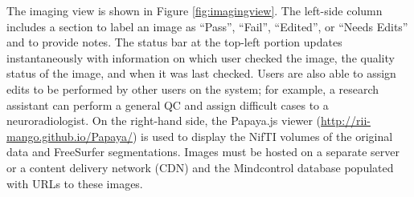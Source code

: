 The imaging view is shown in Figure \ref{fig:imagingview}. The left-side column includes a section to label an image as ``Pass'', ``Fail'', ``Edited'', or ``Needs Edits'' and to provide notes. The status bar at the top-left portion updates instantaneously with information on which user checked the image, the quality status of the image, and when it was last checked. Users are also able to assign edits to be performed by other users on the system; for example, a research assistant can perform a general QC and assign difficult cases to a neuroradiologist. On the right-hand side, the Papaya.js viewer (\href{http://rii-mango.github.io/Papaya/}{http://rii-mango.github.io/Papaya/}) is used to display the NifTI volumes of the original data and FreeSurfer segmentations. Images must be hosted on a separate server or a content delivery network (CDN) and the Mindcontrol database populated with URLs to these images.
